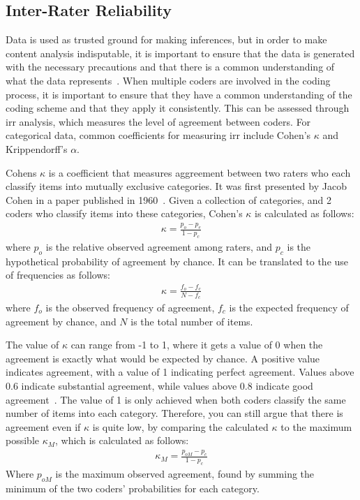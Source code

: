 \subsection{Inter-Rater Reliability}
Data is used as trusted ground for making inferences, but in order to make content analysis indisputable, it is important to ensure that the data is generated with the necessary precautions and that there is a common understanding of what the data represents\ \cite{krippendorff_content_2004}. When multiple coders are involved in the coding process, it is important to ensure that they have a common understanding of the coding scheme and that they apply it consistently. This can be assessed through \gls{irr} analysis, which measures the level of agreement between coders. For categorical data, common coefficients for measuring \gls{irr} include Cohen's \(\kappa \) and Krippendorff's \(\alpha \). 

Cohens \(\kappa \) is a coefficient that measures aggreement between two raters who each classify items into mutually exclusive categories. It was first presented by Jacob Cohen in a paper published in 1960\ \cite{cohen_coefficient_1960}. Given a collection of categories, and 2 coders who classify items into these categories, Cohen's \(\kappa \) is calculated as follows:
\begin{align}
    \kappa = \frac{p_o - p_e}{1 - p_c}
\end{align}
where \(p_o\) is the relative observed agreement among raters, and \(p_c\) is the hypothetical probability of agreement by chance. It can be translated to the use of frequencies as follows:
\begin{align}
    \kappa = \frac{f_o - f_c}{N - f_c}
\end{align}
where \(f_o\) is the observed frequency of agreement, \(f_c\) is the expected frequency of agreement by chance, and \(N\) is the total number of items. 

The value of \(\kappa \) can range from -1 to 1, where it gets a value of 0 when the agreement is exactly what would be expected by chance. A positive value indicates agreement, with a value of 1 indicating perfect agreement. Values above 0.6 indicate substantial agreement, while values above 0.8 indicate good agreement\ \cite{pandey_deductive_2019}. The value of 1 is only achieved when both coders classify the same number of items into each category. Therefore, you can still argue that there is agreement even if \(\kappa \) is quite low, by comparing the calculated \(\kappa \) to the maximum possible \(\kappa_M\), which is calculated as follows:
\begin{align}
    \kappa_M = \frac{p_{oM}-p_c}{1-p_c}
\end{align}
Where \(p_{oM}\) is the maximum observed agreement, found by summing the minimum of the two coders' probabilities for each category.

